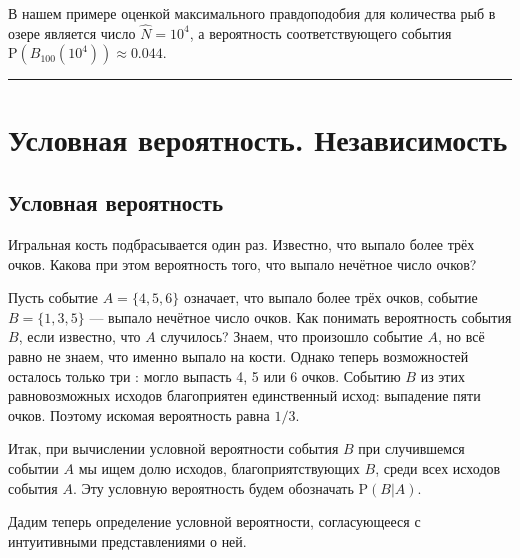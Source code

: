 \documentclass[11pt,a4paper]{article}
\renewcommand{\linethickness}{0.1ex}
\begin{document}
    В нашем примере оценкой максимального правдоподобия для количества рыб в
озере является число \(\hat{N} = 10^4\), а вероятность соответствующего
события \(\mathrm{P}(B_{100}(10^4)) \approx 0.044\).

    \begin{center}\rule{0.5\linewidth}{\linethickness}\end{center}

    \hypertarget{ux443ux441ux43bux43eux432ux43dux430ux44f-ux432ux435ux440ux43eux44fux442ux43dux43eux441ux442ux44c.-ux43dux435ux437ux430ux432ux438ux441ux438ux43cux43eux441ux442ux44c}{%
\section{Условная вероятность.
Независимость}\label{ux443ux441ux43bux43eux432ux43dux430ux44f-ux432ux435ux440ux43eux44fux442ux43dux43eux441ux442ux44c.-ux43dux435ux437ux430ux432ux438ux441ux438ux43cux43eux441ux442ux44c}}

\hypertarget{ux443ux441ux43bux43eux432ux43dux430ux44f-ux432ux435ux440ux43eux44fux442ux43dux43eux441ux442ux44c}{%
\subsection{Условная
вероятность}\label{ux443ux441ux43bux43eux432ux43dux430ux44f-ux432ux435ux440ux43eux44fux442ux43dux43eux441ux442ux44c}}

Игральная кость подбрасывается один раз. Известно, что выпало более трёх
очков. Какова при этом вероятность того, что выпало нечётное число
очков?

Пусть событие \(A = \{4, 5, 6\}\) означает, что выпало более трёх очков,
событие \(B = \{1, 3, 5\}\) --- выпало нечётное число очков. Как
понимать вероятность события \(B\), если известно, что \(A\) случилось?
Знаем, что произошло событие \(A\), но всё равно не знаем, что именно
выпало на кости. Однако теперь возможностей осталось только три : могло
выпасть 4, 5 или 6 очков. Событию \(B\) из этих равновозможных исходов
благоприятен единственный исход: выпадение пяти очков. Поэтому искомая
вероятность равна \(1/3\).

Итак, при вычислении условной вероятности события \(B\) при случившемся
событии \(A\) мы ищем долю исходов, благоприятствующих \(B\), среди всех
исходов события \(A\). Эту условную вероятность будем обозначать
\(\mathrm{P}(B|A)\).

Дадим теперь определение условной вероятности, согласующееся с
интуитивными представлениями о ней.
\end{document}
